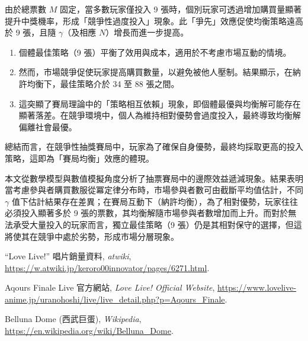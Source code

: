 \documentclass[conference]{IEEEtran}
\begin{document}
\begin{CJK}{UTF8}{bkai}
由於總票數 \(M\) 固定，當多數玩家僅投入 9 張時，個別玩家可透過增加購買量顯著提升中獎機率，形成「競爭性過度投入」現象。此「爭先」效應促使均衡策略遠高於 9 張，且隨 \(\gamma\)（及相應 \(N\)）增長而進一步提高。

\begin{enumerate}
    \item 個體最佳策略（9 張）平衡了效用與成本，適用於不考慮市場互動的情境。
    \item 然而，市場競爭促使玩家提高購買數量，以避免被他人壓制。結果顯示，在納許均衡下，最佳策略介於 34 至 88 張之間。
    \item 這突顯了賽局理論中的「策略相互依賴」現象，即個體最優與均衡解可能存在顯著落差。在競爭環境中，個人為維持相對優勢會過度投入，最終導致均衡解偏離社會最優。
\end{enumerate}

總結而言，在競爭性抽獎賽局中，玩家為了確保自身優勢，最終均採取更高的投入策略，這即為「賽局均衡」效應的體現。

本文從數學模型與數值模擬角度分析了抽票賽局中的邊際效益遞減現象。結果表明當考慮參與者購買數服從冪定律分布時，市場參與者數可由截斷平均值估計，不同 $\gamma$ 值下估計結果存在差異；在賽局互動下（納許均衡），為了相對優勢，玩家往往必須投入顯著多於 9 張的票數，其均衡解隨市場參與者數增加而上升。而對於無法承受大量投入的玩家而言，獨立最佳策略（9 張）仍是其相對保守的選擇，但這將使其在競爭中處於劣勢，形成市場分層現象。


\begin{thebibliography}{10}

``Love Live!'' 唱片銷量資料, \textit{atwiki}, 
\url{https://w.atwiki.jp/keroro00innovator/pages/6271.html}.

Aqours Finale Live 官方網站, \textit{Love Live! Official Website}, 
\url{https://www.lovelive-anime.jp/uranohoshi/live/live_detail.php?p=Aqours_Finale}.

Belluna Dome (西武巨蛋), \textit{Wikipedia}, 
\url{https://en.wikipedia.org/wiki/Belluna_Dome}.

\end{thebibliography}

\end{CJK}
\end{document}
